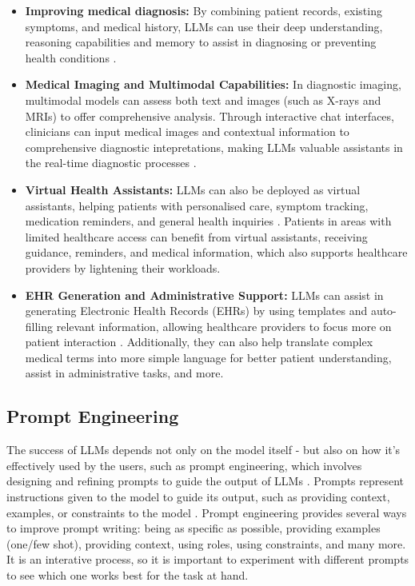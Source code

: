 \begin{itemize}
    \item \textbf{Improving medical diagnosis:} By combining patient records, existing symptoms, and medical history, LLMs can use their deep understanding, reasoning capabilities and memory to assist in diagnosing or preventing health conditions \parencite{llm_healthcare,llm_healthcare3,llm_healthcare4}.
    \item \textbf{Medical Imaging and Multimodal Capabilities:} In diagnostic imaging, multimodal models can assess both text and images (such as X-rays and MRIs) to offer comprehensive analysis. Through interactive chat interfaces, clinicians can input medical images and contextual information to comprehensive diagnostic intepretations, making LLMs valuable assistants in the real-time diagnostic processes \parencite{llm_healthcare3}.
    \item \textbf{Virtual Health Assistants:} LLMs can also be deployed as virtual assistants, helping patients with personalised care, symptom tracking, medication reminders, and general health inquiries \parencite{llm_healthcare,llm_healthcare3}. Patients in areas with limited healthcare access can benefit from virtual assistants, receiving guidance, reminders, and medical information, which also supports healthcare providers by lightening their workloads.
    \item \textbf{EHR Generation and Administrative Support:} LLMs can assist in generating Electronic Health Records (EHRs) by using templates and auto-filling relevant information, allowing healthcare providers to focus more on patient interaction \parencite{llm_healthcare4}. Additionally, they can also help translate complex medical terms into more simple language for better patient understanding, assist in administrative tasks, and more.
\end{itemize}

\subsection{Prompt Engineering}

The success of LLMs depends not only on the model itself - but also on how it's effectively used by the users, such as prompt engineering, which involves designing and refining prompts to guide the output of LLMs \parencite{promptmed}. Prompts represent instructions given to the model to guide its output, such as providing context, examples, or constraints to the model \parencite{prompt}. Prompt engineering provides several ways to improve prompt writing: being as specific as possible, providing examples (one/few shot), providing context, using roles, using constraints, and many more. It is an interative process, so it is important to experiment with different prompts to see which one works best for the task at hand.

